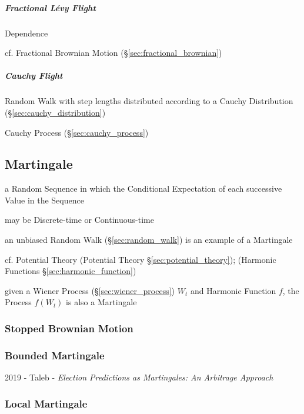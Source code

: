 \subparagraph{Fractional L\'evy Flight}\label{sec:fractional_levy}\hfill

Dependence

\fist cf. Fractional Brownian Motion (\S\ref{sec:fractional_brownian})



\subparagraph{Cauchy Flight}\label{sec:cauchy_flight}\hfill

Random Walk with step lengths distributed according to a Cauchy Distribution
(\S\ref{sec:cauchy_distribution})

\fist Cauchy Process (\S\ref{sec:cauchy_process})



\subsection{Martingale}\label{sec:martingale}

a Random Sequence in which the Conditional Expectation of each successive Value
in the Sequence

may be Discrete-time or Continuous-time

an unbiased Random Walk (\S\ref{sec:random_walk}) is an example of a Martingale

\fist cf. Potential Theory (Potential Theory \S\ref{sec:potential_theory});
(Harmonic Functions \S\ref{sec:harmonic_function})

given a Wiener Process (\S\ref{sec:wiener_process}) $W_t$ and Harmonic Function
$f$, the Process $f(W_t)$ is also a Martingale



\subsubsection{Stopped Brownian Motion}\label{sec:stopped_brownian_motion}

\subsubsection{Bounded Martingale}\label{sec:bounded_martingale}

2019 - Taleb - \emph{Election Predictions as Martingales: An Arbitrage Approach}



\subsubsection{Local Martingale}\label{sec:local_martingale}

